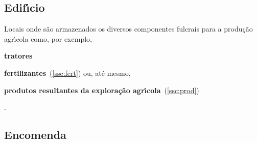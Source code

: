 \documentclass[12pt, a4paper]{article}
\begin{document}



\subsection{Edif\'{\i}cio}\label{ssc:edificio}

Locais onde s\~ao armazenados os diversos componentes fulcrais para a produ\c{c}\~ao
agr\'{\i}cola como, por exemplo,
\begin{enumerate*}[label = (\roman*)]
    \item \textbf{tratores}
    \item \textbf{fertilizantes}~(\ref{ssc:fert})
        ou, at\'e mesmo,
    \item \textbf{produtos resultantes da explora\c{c}\~ao agr\'{\i}cola}~(\ref{ssc:prod})
\end{enumerate*}.


\subsection{Encomenda}\label{ssc:encomenda}
\end{document}
